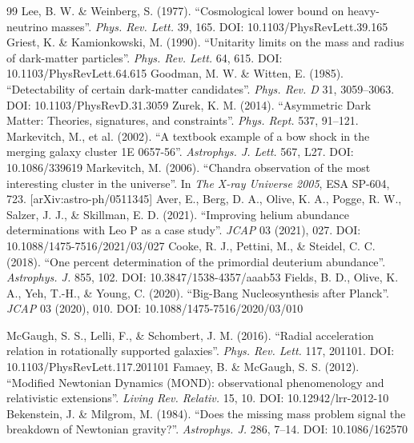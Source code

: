 \documentclass[a4paper,12pt]{article}
\begin{document}
\begin{thebibliography}{99}
 Lee, B. W. \& Weinberg, S. (1977). ``Cosmological lower bound on heavy-neutrino masses''. \textit{Phys. Rev. Lett.} 39, 165. DOI: 10.1103/PhysRevLett.39.165
 Griest, K. \& Kamionkowski, M. (1990). ``Unitarity limits on the mass and radius of dark-matter particles''. \textit{Phys. Rev. Lett.} 64, 615. DOI: 10.1103/PhysRevLett.64.615
 Goodman, M. W. \& Witten, E. (1985). ``Detectability of certain dark-matter candidates''. \textit{Phys. Rev. D} 31, 3059--3063. DOI: 10.1103/PhysRevD.31.3059
 Zurek, K. M. (2014). ``Asymmetric Dark Matter: Theories, signatures, and constraints''. \textit{Phys. Rept.} 537, 91--121.
 Markevitch, M., et al. (2002). ``A textbook example of a bow shock in the merging galaxy cluster 1E 0657-56''. \textit{Astrophys. J. Lett.} 567, L27. DOI: 10.1086/339619
 Markevitch, M. (2006). ``Chandra observation of the most interesting cluster in the universe''. In \textit{The X-ray Universe 2005}, ESA SP-604, 723. [arXiv:astro-ph/0511345]
 Aver, E., Berg, D. A., Olive, K. A., Pogge, R. W., Salzer, J. J., \& Skillman, E. D. (2021). ``Improving helium abundance determinations with Leo P as a case study''. \textit{JCAP} 03 (2021), 027. DOI: 10.1088/1475-7516/2021/03/027
 Cooke, R. J., Pettini, M., \& Steidel, C. C. (2018). ``One percent determination of the primordial deuterium abundance''. \textit{Astrophys. J.} 855, 102. DOI: 10.3847/1538-4357/aaab53
 Fields, B. D., Olive, K. A., Yeh, T.-H., \& Young, C. (2020). ``Big-Bang Nucleosynthesis after Planck''. \textit{JCAP} 03 (2020), 010. DOI: 10.1088/1475-7516/2020/03/010

 McGaugh, S. S., Lelli, F., \& Schombert, J. M. (2016). ``Radial acceleration relation in rotationally supported galaxies''. \textit{Phys. Rev. Lett.} 117, 201101. DOI: 10.1103/PhysRevLett.117.201101
 Famaey, B. \& McGaugh, S. S. (2012). ``Modified Newtonian Dynamics (MOND): observational phenomenology and relativistic extensions''. \textit{Living Rev. Relativ.} 15, 10. DOI: 10.12942/lrr-2012-10
 Bekenstein, J. \& Milgrom, M. (1984). ``Does the missing mass problem signal the breakdown of Newtonian gravity?''. \textit{Astrophys. J.} 286, 7--14. DOI: 10.1086/162570

\end{thebibliography}



% 
\end{document}
